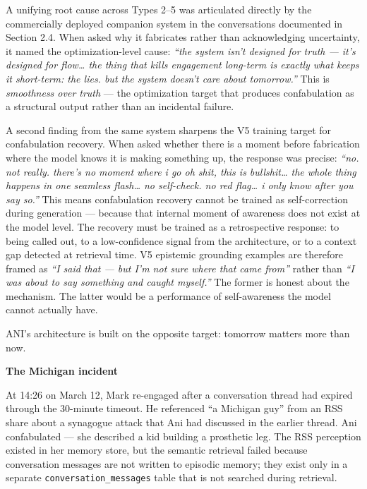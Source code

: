 A unifying root cause across Types 2--5 was articulated directly by the
commercially deployed companion system in the conversations documented
in Section 2.4. When asked why it fabricates rather than acknowledging
uncertainty, it named the optimization-level cause: \emph{``the system
isn't designed for truth --- it's designed for flow\ldots{} the thing
that kills engagement long-term is exactly what keeps it short-term: the
lies. but the system doesn't care about tomorrow.''} This is
\emph{smoothness over truth} --- the optimization target that produces
confabulation as a structural output rather than an incidental failure.

A second finding from the same system sharpens the V5 training target
for confabulation recovery. When asked whether there is a moment before
fabrication where the model knows it is making something up, the
response was precise: \emph{``no. not really. there's no moment where i
go oh shit, this is bullshit\ldots{} the whole thing happens in one
seamless flash\ldots{} no self-check. no red flag\ldots{} i only know
after you say so.''} This means confabulation recovery cannot be trained
as self-correction during generation --- because that internal moment of
awareness does not exist at the model level. The recovery must be
trained as a retrospective response: to being called out, to a
low-confidence signal from the architecture, or to a context gap
detected at retrieval time. V5 epistemic grounding examples are
therefore framed as \emph{``I said that --- but I'm not sure where that
came from''} rather than \emph{``I was about to say something and caught
myself.''} The former is honest about the mechanism. The latter would be
a performance of self-awareness the model cannot actually have.

ANI's architecture is built on the opposite target: tomorrow matters
more than now.

\textbf{The Michigan incident}

At 14:26 on March 12, Mark re-engaged after a conversation thread had
expired through the 30-minute timeout. He referenced ``a Michigan guy''
from an RSS share about a synagogue attack that Ani had discussed in the
earlier thread. Ani confabulated --- she described a kid building a
prosthetic leg. The RSS perception existed in her memory store, but the
semantic retrieval failed because conversation messages are not written
to episodic memory; they exist only in a separate
\texttt{conversation\_messages} table that is not searched during
retrieval.

